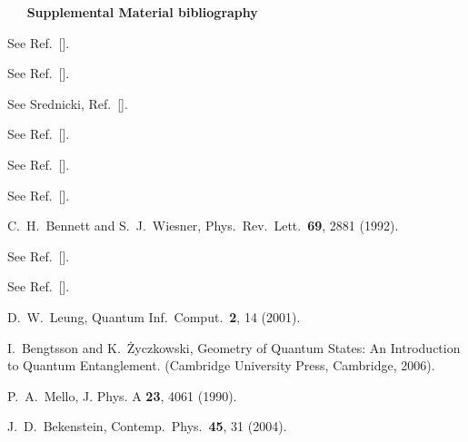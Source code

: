 \documentclass[aps,showpacs,prl,12pt]{revtex4}
\begin{document}
\begin{thebibliography}{16}
\vskip 0.2in
$~~~~~~~${\bf Supplemental Material bibliography}
\vskip 0.1in

See Ref.\ [].

See Ref.\ [].

See Srednicki, Ref.\ [].

See Ref.\ [].

See Ref.\ [].

See Ref.\ [].

C.\ H.\ Bennett and S.\ J.\ Wiesner,
Phys.\ Rev.\ Lett.\ {\bf 69}, 2881 (1992).

See Ref.\ [].

See Ref.\ [].

D.\ W.\ Leung,
Quantum Inf.\ Comput.\ {\bf 2}, 14 (2001).

I.\ Bengtsson and K.\ \.{Z}yczkowski,
Geometry of Quantum States: An Introduction to Quantum Entanglement.
(Cambridge University Press, Cambridge, 2006).

 P.\ A.\ Mello,
J. Phys. A {\bf 23}, 4061 (1990).

 J.\ D.\ Bekenstein,
Contemp.\ Phys.\ {\bf 45}, 31 (2004).

\end{thebibliography}
\end{document}
